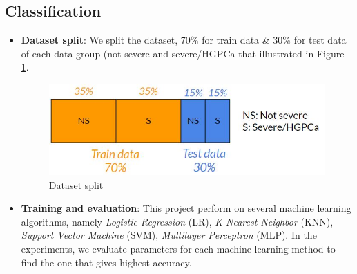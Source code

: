 \documentclass[a4paper,oneside]{article}
\begin{document}
\subsection{Classification}
\begin{itemize}
\item \textbf{Dataset split}: We split the dataset, 70\% for train data \& 30\% for test data of each data group (not severe and severe/HGPCa that illustrated in Figure \ref{fig:data_split}.
\begin{figure}
  \includegraphics[width=0.4\linewidth]{data_split}
  \centering
  \caption{Dataset split}
  \label{fig:data_split}
\end{figure}
\item \textbf{Training and evaluation}: This project perform on several machine learning algorithms, namely \textit{Logistic Regression} (LR), \textit{K-Nearest Neighbor} (KNN), \textit{Support Vector Machine} (SVM), \textit{Multilayer Perceptron} (MLP). In the experiments, we evaluate parameters for each machine learning method to find the one that gives highest accuracy.
\end{itemize}
\end{document}
